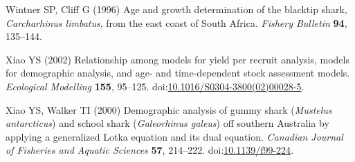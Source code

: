 \documentclass[]{article}
\begin{document}
\leavevmode\hypertarget{ref-wintner_age_1996}{}%
Wintner SP, Cliff G (1996) Age and growth determination of the blacktip
shark, \emph{Carcharhinus limbatus}, from the east coast of South
Africa. \emph{Fishery Bulletin} \textbf{94}, 135--144.

\leavevmode\hypertarget{ref-xiao_relationship_2002}{}%
Xiao YS (2002) Relationship among models for yield per recruit analysis,
models for demographic analysis, and age- and time-dependent stock
assessment models. \emph{Ecological Modelling} \textbf{155}, 95--125.
doi:\href{https://doi.org/10.1016/S0304-3800(02)00028-5}{10.1016/S0304-3800(02)00028-5}.

\leavevmode\hypertarget{ref-xiao_demographic_2000}{}%
Xiao YS, Walker TI (2000) Demographic analysis of gummy shark
(\emph{Mustelus antarcticus}) and school shark (\emph{Galeorhinus
galeus}) off southern Australia by applying a generalized Lotka equation
and its dual equation. \emph{Canadian Journal of Fisheries and Aquatic
Sciences} \textbf{57}, 214--222.
doi:\href{https://doi.org/10.1139/f99-224}{10.1139/f99-224}.
\end{document}
